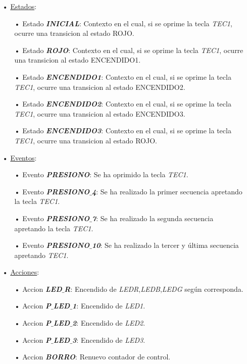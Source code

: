 \documentclass[12pt,letterpaper]{article}
\begin{document}
\begin{enumerate}
\begin{enumerate}
\item[•]\underline{Estados}:
\begin{enumerate}
\item[•]Estado \textit{\textbf{INICIAL}}: Contexto en el cual, si se oprime la tecla \textit{TEC1}, ocurre una transicion al estado ROJO.
\item[•]Estado \textit{\textbf{ROJO}}: Contexto en el cual, si se oprime la tecla \textit{TEC1}, ocurre una transicion al estado ENCENDIDO1.
\item[•]Estado \textit{\textbf{ENCENDIDO1}}: Contexto en el cual, si se oprime la tecla \textit{TEC1}, ocurre una transicion al estado ENCENDIDO2.
\item[•]Estado \textit{\textbf{ENCENDIDO2}}: Contexto en el cual, si se oprime la tecla \textit{TEC1}, ocurre una transicion al estado ENCENDIDO3.
\item[•]Estado \textit{\textbf{ENCENDIDO3}}: Contexto en el cual, si se oprime la tecla \textit{TEC1}, ocurre una transicion al estado ROJO.
\end{enumerate}
\item[•]\underline{Eventos}:
\begin{enumerate}
\item[•]Evento \textit{\textbf{PRESIONO}}: Se ha oprimido la tecla \textit{TEC1}.
\item[•]Evento \textit{\textbf{PRESIONO$\_$4}}: Se ha realizado la primer secuencia apretando la tecla \textit{TEC1}.
\item[•]Evento \textit{\textbf{PRESIONO$\_$7}}: Se ha realizado la segunda secuencia apretando la tecla \textit{TEC1}.
\item[•]Evento \textit{\textbf{PRESIONO$\_$10}}: Se ha realizado la tercer y última secuencia apretando \textit{TEC1}.
\end{enumerate}
\item[•]\underline{Acciones}:
\begin{enumerate}
\item[•]Accion \textit{\textbf{LED$\_$R}}: Encendido de \textit{LEDR},\textit{LEDB},\textit{LEDG} según corresponda.
\item[•]Accion \textit{\textbf{P$\_$LED$\_$1}}: Encendido de \textit{LED1}.
\item[•]Accion \textit{\textbf{P$\_$LED$\_$2}}: Encendido de \textit{LED2}.
\item[•]Accion \textit{\textbf{P$\_$LED$\_$3}}: Encendido de \textit{LED3}.
\item[•]Accion \textit{\textbf{BORRO}}: Renuevo contador de control.
\end{enumerate}
\end{enumerate}


\end{enumerate}
\end{document}
